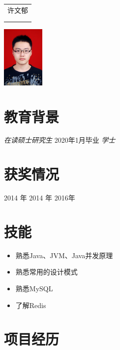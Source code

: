 \documentclass{resume}
\begin{document}

\medskip\noindent
\begin{minipage}{0.7\textwidth}
  \Large{
    \begin{tabu}  { l }
      \scshape{许文郁} \\
       \\
       \\
    \end{tabu}
  }
\end{minipage}
\begin{minipage}{0.3\textwidth}
  \raggedleft
  \includegraphics[height=30mm]{me}
\end{minipage}

\section{教育背景}
\textit{在读硕士研究生} {2020年1月毕业}
\textit{学士}

\section{获奖情况}
 {2014 年}
 {2014 年}
 {2016年}

\section{技能}
\begin{itemize}[parsep=0.5ex]
  \item 熟悉Java、JVM、Java并发原理
  \item 熟悉常用的设计模式
  \item 熟悉MySQL
  \item 了解Redis
\end{itemize}

\section{项目经历}
\end{document}
